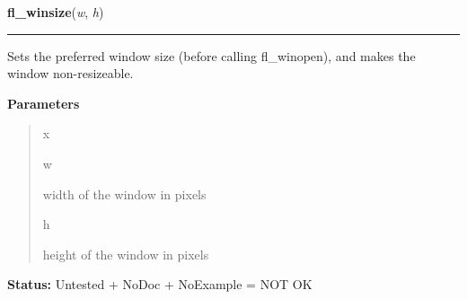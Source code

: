     \label{xformslib:library:fl_winsize}

    \vspace{0.5ex}

\hspace{.8\funcindent}\begin{boxedminipage}{\funcwidth}

    \raggedright \textbf{fl\_winsize}(\textit{w}, \textit{h})

    \vspace{-1.5ex}

    \rule{\textwidth}{0.5\fboxrule}
\setlength{\parskip}{2ex}
    Sets the preferred window size (before calling fl\_winopen), and makes 
    the window non-resizeable.

\setlength{\parskip}{1ex}
      \textbf{Parameters}
      \vspace{-1ex}

      \begin{quote}
        \begin{Ventry}{x}

          \item[w]

          width of the window in pixels

          \item[h]

          height of the window in pixels

        \end{Ventry}

      \end{quote}

\textbf{Status:} Untested + NoDoc + NoExample = NOT OK



    \end{boxedminipage}

    \label{xformslib:library:fl_initial_winsize}

    \vspace{0.5ex}

